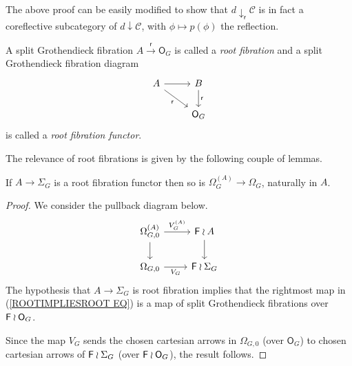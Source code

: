 \documentclass[a4paper,10pt]{article}%
\begin{document}
\begin{remark}
  The above proof can be easily modified to show that $d \downarrow_{\mathsf r} \mathcal C$ is in fact a coreflective subcategory of $d \downarrow \mathcal C$, with $\phi \mapsto p(\phi)$ the reflection.
\end{remark}

\begin{definition}
A split Grothendieck fibration 
$A \xrightarrow{\mathsf{r}} \mathsf{O}_G$
is called a \textit{root fibration} and a split Grothendieck fibration diagram
\[
\begin{tikzcd}
	A \ar{r} \ar{rd}[swap]{\mathsf{r}}&
	B \ar{d}{\mathsf{r}} 
\\
	& \mathsf{O}_G 
\end{tikzcd}
\]
is called a \textit{root fibration functor}.
\end{definition}


The relevance of root fibrations is given by the following couple of lemmas.

\begin{lemma}\label{ROOTFIBPULL LEM}
If $A \to \Sigma_G$ is a root fibration functor then so is 
$\Omega_G^{(A)} \to \Omega_G$, naturally in $A$.
\end{lemma}


\begin{proof}
We consider the pullback diagram below.
\begin{equation}\label{ROOTIMPLIESROOT EQ}
\begin{tikzcd}
	\Omega_{G,0}^{(A)} \ar{r}{V_G^{(A)}} \ar{d} &
	\Fin \wr A \ar{d}
\\
	\Omega_{G,0} \ar{r}[swap]{V_G} &
	\Fin \wr \Sigma_G
\end{tikzcd}
\end{equation}
The hypothesis that $A \to \Sigma_G$ is root fibration 
implies that the rightmost map in (\ref{ROOTIMPLIESROOT EQ})
is a map of split Grothendieck fibrations over
$\mathsf{F} \wr \mathsf{O}_G$.

Since the map $V_G$ sends the chosen cartesian arrows in $\Omega_{G,0}$
(over $\mathsf{O}_G$) to chosen cartesian arrows of $\mathsf{F} \wr \Sigma_G$ (over $\mathsf{F} \wr \mathsf{O}_G$), the result follows.
\end{proof}
\end{document}
